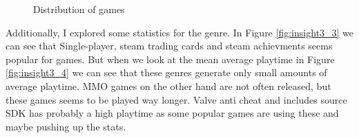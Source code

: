 \documentclass[11pt]{article}
\begin{document}
\begin{figure}[h]
\begin{subfigure}[b]{0.45\columnwidth}
        \label{fig:insight3_2}
    \end{subfigure}
    
    \caption{Distribution of games}
    \label{fig:insight3_distro_plat} 
  \end{figure}

  Additionally, I explored some statistics for the genre. In Figure \ref{fig:insight3_3} we can see that Single-player, steam trading cards and steam achievments seems popular for games. But when we look at the mean average playtime in Figure \ref{fig:insight3_4} we can see that these genres generate only small amounts of average playtime. MMO games on the other hand are not often released, but these games seems to be played way longer. 
  Valve anti cheat and includes source SDK has probably a high playtime as some popular games are using these and maybe pushing up the stats. 
\end{document}
